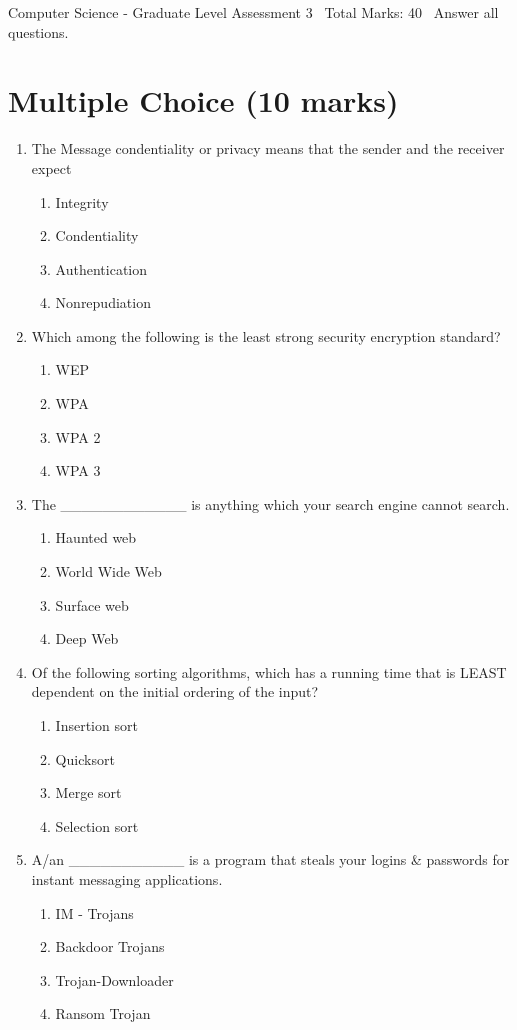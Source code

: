\documentclass[12pt]{article}
\begin{document}
\begin{center}
Computer Science - Graduate Level Assessment 3 \
Total Marks: 40 \
Answer all questions.
\end{center}

\section*{Multiple Choice (10 marks)}
\begin{enumerate}[label=\arabic*.]
\item The Message condentiality or privacy means that the sender and the receiver expect
\begin{enumerate}[label=(\alph*)]
    \item Integrity
    \item Condentiality
    \item Authentication
    \item Nonrepudiation
\end{enumerate}
\item Which among the following is the least strong security encryption standard?
\begin{enumerate}[label=(\alph*)]
    \item WEP
    \item WPA
    \item WPA 2
    \item WPA 3
\end{enumerate}
\item The \_\_\_\_\_\_\_\_\_\_\_\_ is anything which your search engine cannot search.
\begin{enumerate}[label=(\alph*)]
    \item Haunted web
    \item World Wide Web
    \item Surface web
    \item Deep Web
\end{enumerate}
\item Of the following sorting algorithms, which has a running time that is LEAST dependent on the initial ordering of the input?
\begin{enumerate}[label=(\alph*)]
    \item Insertion sort
    \item Quicksort
    \item Merge sort
    \item Selection sort
\end{enumerate}
\item A/an \_\_\_\_\_\_\_\_\_\_\_ is a program that steals your logins \& passwords for instant messaging applications.
\begin{enumerate}[label=(\alph*)]
    \item IM - Trojans
    \item Backdoor Trojans
    \item Trojan-Downloader
    \item Ransom Trojan
\end{enumerate}
\end{enumerate}
\end{document}
